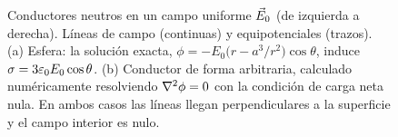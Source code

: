 \begin{figure}[t]
\caption{Conductores neutros en un campo uniforme $\vec{E}_0$ (de izquierda a derecha). Líneas de campo (continuas) y equipotenciales (trazos).
(a) Esfera: la solución exacta, $\phi=-E_0\bigl(r-a^{3}/r^{2}\bigr)\cos\theta$, induce $\sigma=3\varepsilon_{0} E_0\cos\theta$. (b) Conductor de forma
arbitraria, calculado numéricamente resolviendo $\nabla^{2}\phi=0$ con la condición de carga neta nula. En ambos casos las líneas llegan
perpendiculares a la superficie y el campo interior es nulo.}
\label{fig:uniforme}
\end{figure}
